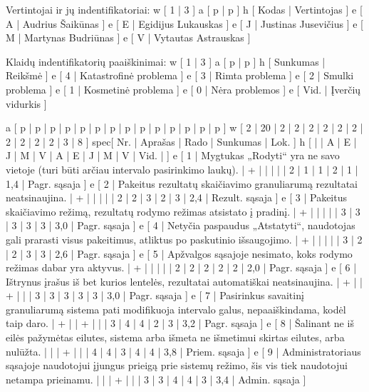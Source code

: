 Vertintojai ir jų indentifikatoriai:
\xtableu
{
  w [ 1 | 3 ]
  a [ p | p ]
  h [ Kodas | Vertintojas ]
  e [ A | Audrius Šaikūnas ]
  e [ E | Egidijus Lukauskas ]
  e [ J | Justinas Jusevičius ]
  e [ M | Martynas Budriūnas ]
  e [ V | Vytautas Astrauskas ]
}

Klaidų indentifikatorių paaiškinimai:
\xtableu
{
  w [ 1 | 3 ]
  a [ p | p ]
  h [ Sunkumas | Reikšmė ]
  e [ 4 | Katastrofinė problema ]
  e [ 3 | Rimta problema ]
  e [ 2 | Smulki problema ]
  e [ 1 | Kosmetinė problema ]
  e [ 0 | Nėra problemos ]
  e [ Vid. | Įverčių vidurkis ]
}

\xtableu
{
  a [ p   | p       | p | p | p | p | p | p | p | p | p | p | p    | p    ]
  w [ 2   | 20      | 2 | 2 | 2 | 2 | 2 | 2 | 2 | 2 | 2 | 2 | 3    | 8    ]
spec[ Nr. | Aprašas | Rado              | Sunkumas                 | Lok. ]
  h [     |         | A | E | J | M | V | A | E | J | M | V | Vid. |      ]
  e [ 1   | Mygtukas „Rodyti“ yra ne savo vietoje (turi būti arčiau intervalo
  pasirinkimo laukų).
                    | + |   |   |   |   | 2 | 1 | 1 | 2 | 1 | 1,4  | Pagr. sąsaja ]
  e [ 2   | Pakeitus rezultatų skaičiavimo granuliarumą rezultatai neatsinaujina.
                    | + |   |   |   |   | 2 | 2 | 3 | 2 | 3 | 2,4  | Rezult. sąsaja ]
  e [ 3   | Pakeitus skaičiavimo režimą, rezultatų rodymo režimas atsistato
  į pradinį.
                    | + |   |   |   |   | 3 | 3 | 3 | 3 | 3 | 3,0  | Pagr. sąsaja ]
  e [ 4   | Netyčia paspaudus „Atstatyti“, naudotojas gali prarasti visus pakeitimus,
  atliktus po paskutinio išsaugojimo.
                    | + |   |   |   |   | 3 | 2 | 2 | 3 | 3 | 2,6  | Pagr. sąsaja ]
  e [ 5   | Apžvalgos sąsajoje nesimato, koks rodymo režimas dabar yra aktyvus.
                    | + |   |   |   |   | 2 | 2 | 2 | 2 | 2 | 2,0  | Pagr. sąsaja ]
  e [ 6   | Ištrynus įrašus iš bet kurios lentelės, rezultatai automatiškai neatsinaujina.
                    | + |   | + |   |   | 3 | 3 | 3 | 3 | 3 | 3,0  | Pagr. sąsaja ]
  e [ 7   | Pasirinkus savaitinį granuliarumą sistema pati modifikuoja intervalo galus,
  nepaaiškindama, kodėl taip daro.
                    | + |   | + |   |   | 3 | 4 | 4 | 2 | 3 | 3,2  | Pagr. sąsaja ]
  e [ 8   | Šalinant ne iš eilės pažymėtas eilutes, sistema arba išmeta ne išmetimui
  skirtas eilutes, arba nulūžta.
                    |   |   | + |   |   | 4 | 4 | 3 | 4 | 4 | 3,8  | Priem. sąsaja ]
  e [ 9   | Administratoriaus sąsajoje naudotojui įjungus prieigą prie sistemų
  režimo, šis vis tiek naudotojui netampa prieinamu.
                    |   |   | + |   |   | 3 | 3 | 4 | 4 | 3 | 3,4  | Admin. sąsaja ]
}
